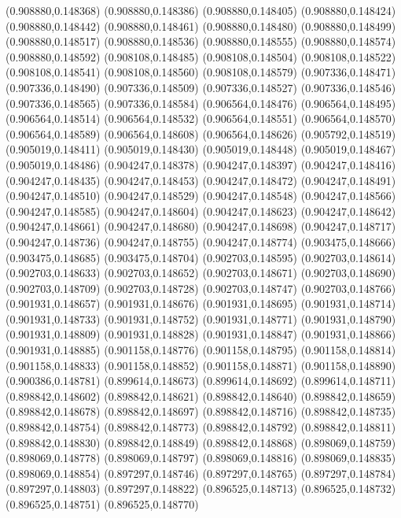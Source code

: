 (0.908880,0.148368)
(0.908880,0.148386)
(0.908880,0.148405)
(0.908880,0.148424)
(0.908880,0.148442)
(0.908880,0.148461)
(0.908880,0.148480)
(0.908880,0.148499)
(0.908880,0.148517)
(0.908880,0.148536)
(0.908880,0.148555)
(0.908880,0.148574)
(0.908880,0.148592)
(0.908108,0.148485)
(0.908108,0.148504)
(0.908108,0.148522)
(0.908108,0.148541)
(0.908108,0.148560)
(0.908108,0.148579)
(0.907336,0.148471)
(0.907336,0.148490)
(0.907336,0.148509)
(0.907336,0.148527)
(0.907336,0.148546)
(0.907336,0.148565)
(0.907336,0.148584)
(0.906564,0.148476)
(0.906564,0.148495)
(0.906564,0.148514)
(0.906564,0.148532)
(0.906564,0.148551)
(0.906564,0.148570)
(0.906564,0.148589)
(0.906564,0.148608)
(0.906564,0.148626)
(0.905792,0.148519)
(0.905019,0.148411)
(0.905019,0.148430)
(0.905019,0.148448)
(0.905019,0.148467)
(0.905019,0.148486)
(0.904247,0.148378)
(0.904247,0.148397)
(0.904247,0.148416)
(0.904247,0.148435)
(0.904247,0.148453)
(0.904247,0.148472)
(0.904247,0.148491)
(0.904247,0.148510)
(0.904247,0.148529)
(0.904247,0.148548)
(0.904247,0.148566)
(0.904247,0.148585)
(0.904247,0.148604)
(0.904247,0.148623)
(0.904247,0.148642)
(0.904247,0.148661)
(0.904247,0.148680)
(0.904247,0.148698)
(0.904247,0.148717)
(0.904247,0.148736)
(0.904247,0.148755)
(0.904247,0.148774)
(0.903475,0.148666)
(0.903475,0.148685)
(0.903475,0.148704)
(0.902703,0.148595)
(0.902703,0.148614)
(0.902703,0.148633)
(0.902703,0.148652)
(0.902703,0.148671)
(0.902703,0.148690)
(0.902703,0.148709)
(0.902703,0.148728)
(0.902703,0.148747)
(0.902703,0.148766)
(0.901931,0.148657)
(0.901931,0.148676)
(0.901931,0.148695)
(0.901931,0.148714)
(0.901931,0.148733)
(0.901931,0.148752)
(0.901931,0.148771)
(0.901931,0.148790)
(0.901931,0.148809)
(0.901931,0.148828)
(0.901931,0.148847)
(0.901931,0.148866)
(0.901931,0.148885)
(0.901158,0.148776)
(0.901158,0.148795)
(0.901158,0.148814)
(0.901158,0.148833)
(0.901158,0.148852)
(0.901158,0.148871)
(0.901158,0.148890)
(0.900386,0.148781)
(0.899614,0.148673)
(0.899614,0.148692)
(0.899614,0.148711)
(0.898842,0.148602)
(0.898842,0.148621)
(0.898842,0.148640)
(0.898842,0.148659)
(0.898842,0.148678)
(0.898842,0.148697)
(0.898842,0.148716)
(0.898842,0.148735)
(0.898842,0.148754)
(0.898842,0.148773)
(0.898842,0.148792)
(0.898842,0.148811)
(0.898842,0.148830)
(0.898842,0.148849)
(0.898842,0.148868)
(0.898069,0.148759)
(0.898069,0.148778)
(0.898069,0.148797)
(0.898069,0.148816)
(0.898069,0.148835)
(0.898069,0.148854)
(0.897297,0.148746)
(0.897297,0.148765)
(0.897297,0.148784)
(0.897297,0.148803)
(0.897297,0.148822)
(0.896525,0.148713)
(0.896525,0.148732)
(0.896525,0.148751)
(0.896525,0.148770)
